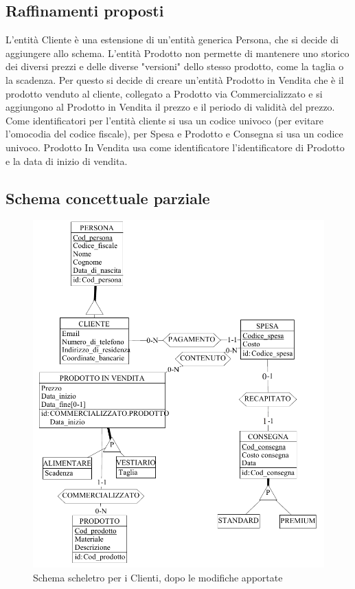 \documentclass[a4paper,12pt]{report}
\begin{document}
\subsection{Raffinamenti proposti}
L'entità Cliente è una estensione di un'entità generica Persona, che si decide di aggiungere allo schema. 
L'entità Prodotto non permette di mantenere uno storico dei diversi prezzi e delle diverse "versioni" dello stesso prodotto, come la taglia o la scadenza. 
Per questo si decide di creare un'entità Prodotto in Vendita che è il prodotto venduto al cliente, collegato a Prodotto via Commercializzato e si aggiungono al Prodotto in Vendita il prezzo e il periodo di validità del prezzo. 
Come identificatori per l'entità cliente si usa un codice univoco (per evitare l'omocodia del codice fiscale), per Spesa e Prodotto e Consegna si usa un codice univoco. Prodotto In Vendita usa come identificatore l'identificatore di Prodotto e la data di inizio di vendita.
\subsection{Schema concettuale parziale}
\begin{figure}[h]
	\centering{}
	\includegraphics[width=\textwidth]{img/SchemaConcettuale-Clienti2.pdf}
	\caption{Schema scheletro per i Clienti, dopo le modifiche apportate}
\end{figure}
\end{document}
